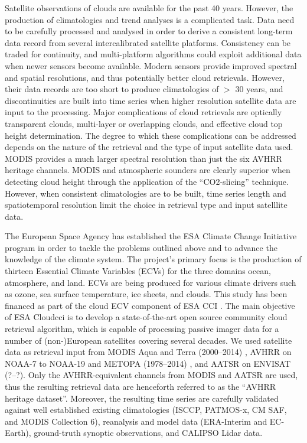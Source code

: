 Satellite observations of clouds are available for the past 40 years. However,
the production of climatologies and trend analyses is a complicated
task. Data need to be carefully processed and analysed in order
to derive a consistent long-term data record from several intercalibrated satellite
platforms. Consistency can be traded for continuity, and multi-platform
algorithms could exploit additional data when newer sensors become
available. Modern sensors provide improved spectral and spatial resolutions,
and thus potentially better cloud retrievals. However, their data records are too short to produce
climatologies of $>$ 30 years, and discontinuities are built into time series
when higher resolution satellite data are input to the processing.
Major complications of cloud retrievals are optically transparent clouds, multi-layer or overlapping clouds, and effective cloud top height determination. The degree to which these complications can be addressed depends on the nature of the retrieval and the type of input satellite data used. MODIS provides a much larger spectral resolution than just the six AVHRR heritage channels. MODIS and atmospheric sounders are clearly superior when detecting cloud height through the application of the ``CO2-slicing'' technique. However, when consistent climatologies are to be built, time series length and spatiotemporal resolution limit the choice in retrieval type and input satelllite data.  


The European Space Agency has established the ESA Climate
Change Initiative program \citep{ESA_CCI_web,Hollmann13} in order to tackle
the problems outlined above and to advance the knowledge of the climate system.
The project's primary focus is the production of
thirteen Essential Climate Variables (ECVs) for the three domains ocean,
atmosphere, and land. ECVs are being produced for various climate drivers such as ozone, sea surface
temperature, ice sheets, and clouds. This study has been financed as part of the cloud ECV component of
ESA CCI \citep{ESA_Cloud_CCI_web}.
The main objective of ESA Cloud\textunderscore cci is to develop a state-of-the-art open source community
cloud retrieval algorithm, which is capable of processing passive imager data for a
number of \mbox{(non-)European} satellites covering several decades.
We used satellite data as retrieval input from MODIS Aqua and Terra (2000--2014) \citep{King92}, AVHRR on NOAA-7 to
NOAA-19 and METOPA (1978--2014) \citep{Jacobowitz03}, and AATSR on ENVISAT (?--?).
Only the AVHRR-equivalent channels from MODIS and AATSR are
used, thus the resulting retrieval data are henceforth referred to as the ``AVHRR heritage
dataset''. Moreover, the
resulting time series are carefully validated against well established existing climatologies (ISCCP, PATMOS-x, CM SAF, and MODIS
Collection 6), reanalysis and model data (ERA-Interim and EC-Earth),
ground-truth synoptic observations, and CALIPSO Lidar data.

